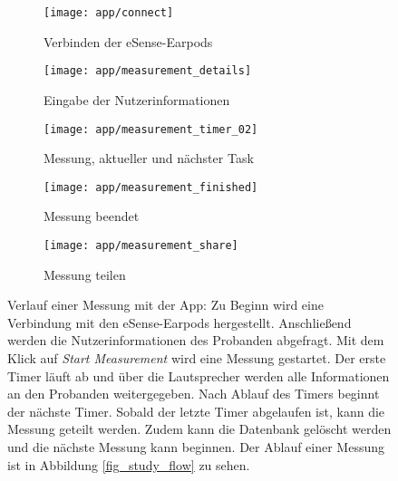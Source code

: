 \begin{figure}[ht]
  \centering
  \begin{subfigure}{.25\textwidth}
    \texttt{[image: app/connect]}
    \caption{Verbinden der eSense-Earpods}
    \label{implementation:app:screenshots:connect_bluetooth}
  \end{subfigure}
  \begin{subfigure}{.25\textwidth}
    \texttt{[image: app/measurement\_details]}
    \caption{Eingabe der Nutzerinformationen}
    \label{implementation:app:screenshots:user_studies_information}
  \end{subfigure}
  \begin{subfigure}{.25\textwidth}
    \texttt{[image: app/measurement\_timer\_02]}
    \caption{Messung, aktueller und nächster Task}
    \label{implementation:app:screenshots:measurement_started}
  \end{subfigure}
  \begin{subfigure}{.25\textwidth}
    \texttt{[image: app/measurement\_finished]}
    \caption{Messung beendet}
    \label{implementation:app:screenshots:sampling_stopped}
  \end{subfigure}
  \begin{subfigure}{.25\textwidth}
    \texttt{[image: app/measurement\_share]}
    \caption{Messung teilen}
    \label{implementation:app:screenshots:share}
  \end{subfigure}
  \caption{Verlauf einer Messung mit der App: Zu Beginn wird eine Verbindung mit den eSense-Earpods hergestellt. Anschließend werden die Nutzerinformationen des Probanden abgefragt. Mit dem Klick auf \textit{Start Measurement} wird eine Messung gestartet. Der erste Timer läuft ab und über die Lautsprecher werden alle Informationen an den Probanden weitergegeben. Nach Ablauf des Timers beginnt der nächste Timer. Sobald der letzte Timer abgelaufen ist, kann die Messung geteilt werden. Zudem kann die Datenbank gelöscht werden und die nächste Messung kann beginnen. Der Ablauf einer Messung ist in Abbildung \ref{fig_study_flow} zu sehen.}
  \label{implementation:app:screenshots}
\end{figure}

